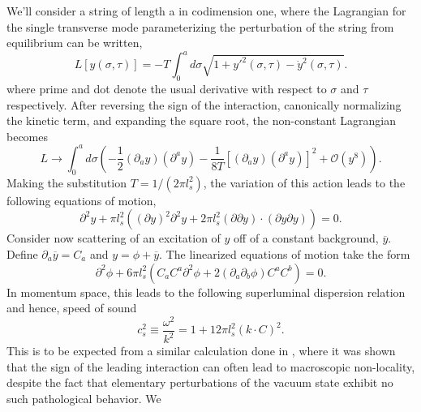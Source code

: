 \documentclass[%
 reprint,
 amsmath,amssymb,
 aps,
]{revtex4-1}
\begin{document}
We'll consider a string of length a in codimension one, where the Lagrangian for the single transverse mode
parameterizing the perturbation of the string from equilibrium can be written,
\begin{equation}
    L[y(\sigma,\tau)] = -T \int_0^a d\sigma \sqrt{1 + y'^2(\sigma,\tau) - \dot{y}^2(\sigma,\tau)} \nonumber.
\end{equation}
where prime and dot denote the usual derivative with respect to $\sigma$ and $\tau$ respectively. After reversing the
sign of the interaction, canonically normalizing the kinetic term, and expanding the square root, the non-constant
Lagrangian becomes
\begin{equation}
    L \rightarrow \int_0^a d\sigma (-\frac{1}{2} (\partial_{a} y)(\partial^{a} y) -
    \frac{1}{8 T}[(\partial_{a} y)(\partial^{a} y)]^2 + \mathcal{O}(y^8)) \nonumber.
\end{equation}
Making the substitution $T = 1/(2 \pi l_s^2)$, the variation of this action leads to the following equations of motion,
\begin{equation}
    \partial^2 y + \pi l_s^2 ((\partial y)^2 \partial^2 y + 2 \pi l_s^2 (\partial \partial y) \cdot (\partial y \partial
    y)) = 0 \nonumber .
\end{equation}
Consider now scattering of an excitation of $y$ off of a constant background, $\overline{y}$.  Define $\partial_{a}
\overline{y} = C_{a}$ and $y = \phi + \overline{y}$.
The linearized equations of motion take the form
\begin{equation}
    \partial^2 \phi + 6 \pi l_s^2 ( C_{a} C^{a} \partial^2 \phi + 2 (\partial_{a} \partial_{b} \phi) C^{a}
    C^{b}) = 0 .
\end{equation}
In momentum space, this leads to the following superluminal dispersion relation and hence, speed of sound
\begin{equation}
    c_s^2 \equiv \frac{\omega^2}{k^2} = 1 + 12 \pi l_s^2 (k \cdot C)^2 \nonumber .
\end{equation}
This is to be expected from a similar calculation done in \cite{Adams:2006sv}, where it was shown that the sign of the
leading interaction can often lead to macroscopic non-locality, despite the fact that elementary perturbations of the
vacuum state exhibit no such pathological behavior.  We


\end{document}
